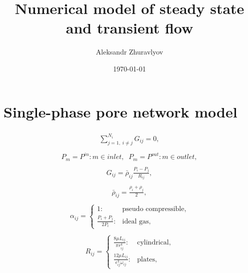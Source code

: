 \documentclass[a4paper,12pt]{extreport}
\author{Aleksandr Zhuravlyov}
\title{Numerical model of steady state and transient flow}
\date{\today}
\begin{document}
    \pagecolor{pageColor}
    \color{fontColor}

    \section*{Single-phase pore network model}

    \begin{eqnarray}
    \label{one_phase} 
    \begin{gathered}
    \sum^{N_{i}}_{j=1, \; i\neq j} G_{ij} = 0,
    \end{gathered}
    \end{eqnarray}
    \begin{eqnarray}
    \begin{gathered}
    \label{press_bound}
    P_{m} = P^{in}   : m \in inlet, \;\;
    P_{m} = P^{out}   :m \in outlet,
    \end{gathered}
    \end{eqnarray}
    \begin{eqnarray}
    \begin{gathered}
    \label{eq:mass_flux_simple_pnm}
    G_{ij} = \bar{\rho}_{ij} \frac{P_{i} - P_{j}}{R_{ij}},
    \end{gathered}
    \end{eqnarray}
     \begin{eqnarray}
    \begin{gathered}
    \bar{\rho}_{ij} = \frac{\rho_{i}+\rho_{j}}{2},
    \end{gathered}
    \end{eqnarray}
    \begin{eqnarray}
        \begin{gathered}
            \alpha_{ij} =\begin{cases}
                             1: &\text{pseudo compressible},\\
                             \frac{P_i + P_j}{2P_i}: &\text{ideal gas},
            \end{cases}
        \end{gathered}
    \end{eqnarray}
\begin{eqnarray}
\begin{gathered}
R_{ij} =\begin{cases}
\frac{8 \mu L_{ij}}{\pi r_{ij}^{4}}: &\text{cylindrical},\\
\frac{12 \mu L_{ij}}{\epsilon_{ij}^{3} \omega_{ij}}: &\text{plates},
\end{cases}
\end{gathered}
\end{eqnarray}
\end{document}
